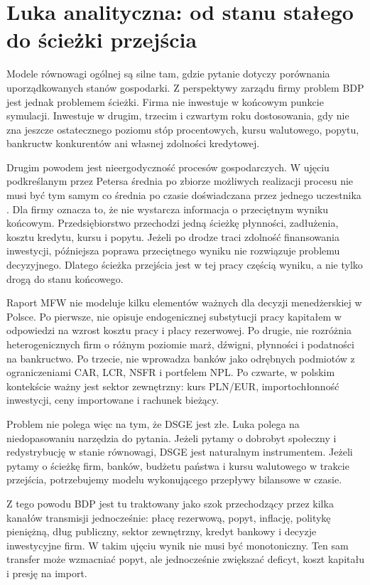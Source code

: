\section{Luka analityczna: od stanu stałego do ścieżki przejścia}

Modele równowagi ogólnej są silne tam, gdzie pytanie dotyczy porównania uporządkowanych stanów gospodarki. Z perspektywy zarządu firmy problem BDP jest jednak problemem ścieżki. Firma nie inwestuje w końcowym punkcie symulacji. Inwestuje w drugim, trzecim i czwartym roku dostosowania, gdy nie zna jeszcze ostatecznego poziomu stóp procentowych, kursu walutowego, popytu, bankructw konkurentów ani własnej zdolności kredytowej.

Drugim powodem jest nieergodyczność procesów gospodarczych. W ujęciu podkreślanym przez Petersa średnia po zbiorze możliwych realizacji procesu nie musi być tym samym co średnia po czasie doświadczana przez jednego uczestnika \parencite{peters2019,petersGellMann2016}. Dla firmy oznacza to, że nie wystarcza informacja o przeciętnym wyniku końcowym. Przedsiębiorstwo przechodzi jedną ścieżkę płynności, zadłużenia, kosztu kredytu, kursu i popytu. Jeżeli po drodze traci zdolność finansowania inwestycji, późniejsza poprawa przeciętnego wyniku nie rozwiązuje problemu decyzyjnego. Dlatego ścieżka przejścia jest w tej pracy częścią wyniku, a nie tylko drogą do stanu końcowego.

Raport MFW nie modeluje kilku elementów ważnych dla decyzji menedżerskiej w Polsce. Po pierwsze, nie opisuje endogenicznej substytucji pracy kapitałem w odpowiedzi na wzrost kosztu pracy i płacy rezerwowej. Po drugie, nie rozróżnia heterogenicznych firm o różnym poziomie marż, dźwigni, płynności i podatności na bankructwo. Po trzecie, nie wprowadza banków jako odrębnych podmiotów z ograniczeniami CAR, LCR, NSFR i portfelem NPL. Po czwarte, w polskim kontekście ważny jest sektor zewnętrzny: kurs PLN/EUR, importochłonność inwestycji, ceny importowane i rachunek bieżący.

Problem nie polega więc na tym, że DSGE jest złe. Luka polega na niedopasowaniu narzędzia do pytania. Jeżeli pytamy o dobrobyt społeczny i redystrybucję w stanie równowagi, DSGE jest naturalnym instrumentem. Jeżeli pytamy o ścieżkę firm, banków, budżetu państwa i kursu walutowego w trakcie przejścia, potrzebujemy modelu wykonującego przepływy bilansowe w czasie.

Z tego powodu BDP jest tu traktowany jako szok przechodzący przez kilka kanałów transmisji jednocześnie: płacę rezerwową, popyt, inflację, politykę pieniężną, dług publiczny, sektor zewnętrzny, kredyt bankowy i decyzje inwestycyjne firm. W takim ujęciu wynik nie musi być monotoniczny. Ten sam transfer może wzmacniać popyt, ale jednocześnie zwiększać deficyt, koszt kapitału i presję na import.

